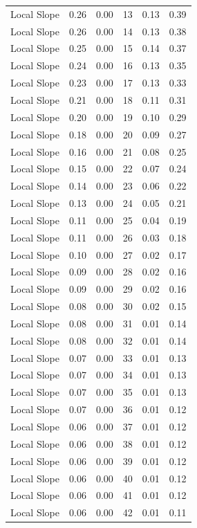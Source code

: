 \documentclass[
]{article}
\begin{document}
\begin{longtable}[]{@{}lrrrrr@{}}
Local Slope & 0.26 & 0.00 & 13 & 0.13 & 0.39 \\
Local Slope & 0.26 & 0.00 & 14 & 0.13 & 0.38 \\
Local Slope & 0.25 & 0.00 & 15 & 0.14 & 0.37 \\
Local Slope & 0.24 & 0.00 & 16 & 0.13 & 0.35 \\
Local Slope & 0.23 & 0.00 & 17 & 0.13 & 0.33 \\
Local Slope & 0.21 & 0.00 & 18 & 0.11 & 0.31 \\
Local Slope & 0.20 & 0.00 & 19 & 0.10 & 0.29 \\
Local Slope & 0.18 & 0.00 & 20 & 0.09 & 0.27 \\
Local Slope & 0.16 & 0.00 & 21 & 0.08 & 0.25 \\
Local Slope & 0.15 & 0.00 & 22 & 0.07 & 0.24 \\
Local Slope & 0.14 & 0.00 & 23 & 0.06 & 0.22 \\
Local Slope & 0.13 & 0.00 & 24 & 0.05 & 0.21 \\
Local Slope & 0.11 & 0.00 & 25 & 0.04 & 0.19 \\
Local Slope & 0.11 & 0.00 & 26 & 0.03 & 0.18 \\
Local Slope & 0.10 & 0.00 & 27 & 0.02 & 0.17 \\
Local Slope & 0.09 & 0.00 & 28 & 0.02 & 0.16 \\
Local Slope & 0.09 & 0.00 & 29 & 0.02 & 0.16 \\
Local Slope & 0.08 & 0.00 & 30 & 0.02 & 0.15 \\
Local Slope & 0.08 & 0.00 & 31 & 0.01 & 0.14 \\
Local Slope & 0.08 & 0.00 & 32 & 0.01 & 0.14 \\
Local Slope & 0.07 & 0.00 & 33 & 0.01 & 0.13 \\
Local Slope & 0.07 & 0.00 & 34 & 0.01 & 0.13 \\
Local Slope & 0.07 & 0.00 & 35 & 0.01 & 0.13 \\
Local Slope & 0.07 & 0.00 & 36 & 0.01 & 0.12 \\
Local Slope & 0.06 & 0.00 & 37 & 0.01 & 0.12 \\
Local Slope & 0.06 & 0.00 & 38 & 0.01 & 0.12 \\
Local Slope & 0.06 & 0.00 & 39 & 0.01 & 0.12 \\
Local Slope & 0.06 & 0.00 & 40 & 0.01 & 0.12 \\
Local Slope & 0.06 & 0.00 & 41 & 0.01 & 0.12 \\
Local Slope & 0.06 & 0.00 & 42 & 0.01 & 0.11 \\

\end{longtable}
\end{document}
